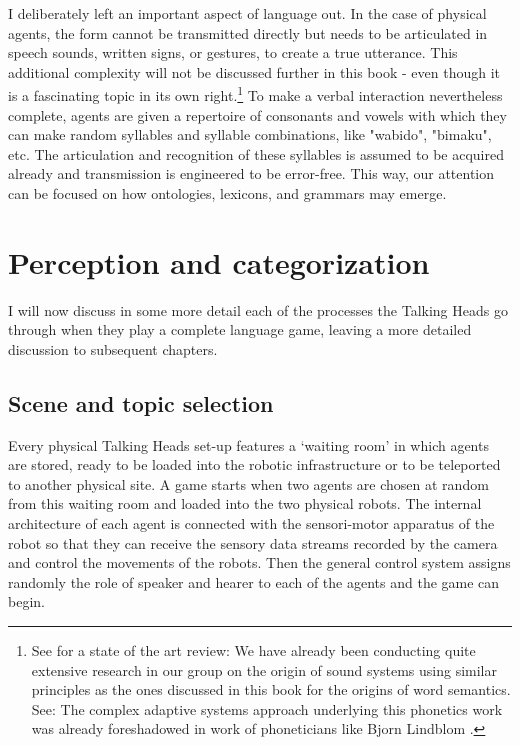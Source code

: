 I deliberately left an important aspect of language out. 
In the case of physical agents, the form cannot be transmitted
directly but needs to be articulated in speech sounds, 
written signs, or gestures, to create a true utterance. This additional 
complexity will not be discussed further in this book - even though 
it is a fascinating topic in its own right.\footnote{
See for a state of the art review: \cite{Clark:1990}
We have already been conducting quite extensive 
research in our group on the origin of sound systems 
using similar principles as the ones discussed in this 
book for the origins of word semantics. 
See: \cite{DeBoer:1997} The complex 
adaptive systems approach underlying this phonetics
work was already foreshadowed in work of phoneticians
like Bjorn Lindblom \cite{Liljencrants:1972}.}
To make a verbal interaction nevertheless complete, agents
are given a repertoire of consonants and vowels with 
which they can make random syllables and syllable combinations, 
like "wabido", "bimaku", etc. The articulation and 
recognition of these syllables is assumed to be acquired
already and transmission is engineered to be error-free. 
This way, our attention can be focused on how
ontologies, lexicons, and grammars may emerge. 

\section{Perception and categorization}

I will now discuss in some more detail each of the processes
the Talking Heads go through when they 
play a complete language game, leaving a more detailed 
discussion to subsequent chapters.

\subsection{Scene and topic selection}

Every physical Talking Heads set-up features a `waiting room' in 
which agents are stored, ready to be loaded into the 
robotic infrastructure or to be teleported to another
physical site. A game starts when two agents are chosen
at random from this waiting room and loaded into 
the two physical robots. The
internal architecture of each agent is connected with 
the sensori-motor apparatus of the robot so that they can 
receive the sensory data streams recorded by the camera
and control the movements of the robots. Then the general 
control system assigns randomly the role of speaker and hearer
to each of the agents and the game can begin. 

